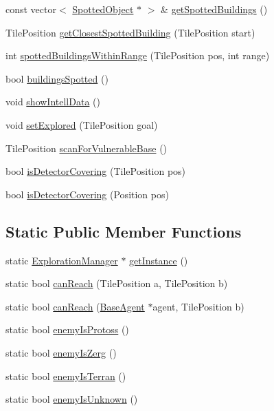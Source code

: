 \begin{DoxyCompactItemize}
\item 
const vector$<$ \hyperlink{class_spotted_object}{Spotted\-Object} $\ast$ $>$ \& \hyperlink{class_exploration_manager_a9f960b45782e863979a7795eedee8a6f}{get\-Spotted\-Buildings} ()
\item 
Tile\-Position \hyperlink{class_exploration_manager_aa9e211acbc6151fdad4c18919144300d}{get\-Closest\-Spotted\-Building} (Tile\-Position start)
\item 
int \hyperlink{class_exploration_manager_a20936d696394e1860a70b1ca0d23872b}{spotted\-Buildings\-Within\-Range} (Tile\-Position pos, int range)
\item 
bool \hyperlink{class_exploration_manager_a8e5343060fd9f6fd7fcee353fc4af746}{buildings\-Spotted} ()
\item 
void \hyperlink{class_exploration_manager_a1d800673b5e57e81fc555d862e4885da}{show\-Intell\-Data} ()
\item 
void \hyperlink{class_exploration_manager_a9984dd436e014947289def3172bfb13c}{set\-Explored} (Tile\-Position goal)
\item 
Tile\-Position \hyperlink{class_exploration_manager_a8681689039f4fa17b6287ace18030259}{scan\-For\-Vulnerable\-Base} ()
\item 
bool \hyperlink{class_exploration_manager_a2bff78255c2505cbaaab85d9c13bb4b6}{is\-Detector\-Covering} (Tile\-Position pos)
\item 
bool \hyperlink{class_exploration_manager_a853f44af81ce152857967e7a4240017b}{is\-Detector\-Covering} (Position pos)
\end{DoxyCompactItemize}
\subsection*{Static Public Member Functions}
\begin{DoxyCompactItemize}
\item 
static \hyperlink{class_exploration_manager}{Exploration\-Manager} $\ast$ \hyperlink{class_exploration_manager_aa02f4d88b05e9fbd16edf75b95c03ea1}{get\-Instance} ()
\item 
static bool \hyperlink{class_exploration_manager_a9d6c888b3de596500709c066599e8263}{can\-Reach} (Tile\-Position a, Tile\-Position b)
\item 
static bool \hyperlink{class_exploration_manager_a89208c080d691c0b73a78945b017c6ba}{can\-Reach} (\hyperlink{class_base_agent}{Base\-Agent} $\ast$agent, Tile\-Position b)
\item 
static bool \hyperlink{class_exploration_manager_a9988f36db374fb797f4ea881f410b709}{enemy\-Is\-Protoss} ()
\item 
static bool \hyperlink{class_exploration_manager_ab5f2e9dd74fe898af4f870a5175ab36f}{enemy\-Is\-Zerg} ()
\item 
static bool \hyperlink{class_exploration_manager_abf2f53be68b91b886ee1be84a8e27b55}{enemy\-Is\-Terran} ()
\item 
static bool \hyperlink{class_exploration_manager_ad2059b552d8b15ca1e0fda85372f46f2}{enemy\-Is\-Unknown} ()
\end{DoxyCompactItemize}


